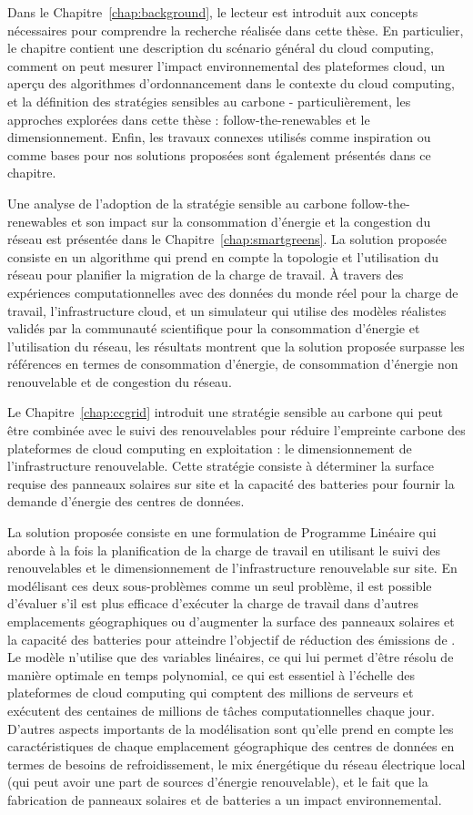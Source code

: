 Dans le Chapitre~\ref{chap:background}, le lecteur est introduit aux concepts nécessaires pour comprendre la recherche réalisée dans cette thèse. En particulier, le chapitre contient une description du scénario général du cloud computing, comment on peut mesurer l'impact environnemental des plateformes cloud, un aperçu des algorithmes d'ordonnancement dans le contexte du cloud computing, et la définition des stratégies sensibles au carbone - particulièrement, les approches explorées dans cette thèse : follow-the-renewables et le dimensionnement. Enfin, les travaux connexes utilisés comme inspiration ou comme bases pour nos solutions proposées sont également présentés dans ce chapitre.

Une analyse de l'adoption de la stratégie sensible au carbone follow-the-renewables et son impact sur la consommation d'énergie et la congestion du réseau est présentée dans le Chapitre~\ref{chap:smartgreens}. La solution proposée consiste en un algorithme qui prend en compte la topologie et l'utilisation du réseau pour planifier la migration de la charge de travail. À travers des expériences computationnelles avec des données du monde réel pour la charge de travail, l'infrastructure cloud, et un simulateur qui utilise des modèles réalistes validés par la communauté scientifique pour la consommation d'énergie et l'utilisation du réseau, les résultats montrent que la solution proposée surpasse les références en termes de consommation d'énergie, de consommation d'énergie non renouvelable et de congestion du réseau.


Le Chapitre~\ref{chap:ccgrid} introduit une stratégie sensible au carbone qui peut être combinée avec le suivi des renouvelables pour réduire l'empreinte carbone des plateformes de cloud computing en exploitation : le dimensionnement de l'infrastructure renouvelable. Cette stratégie consiste à déterminer la surface requise des panneaux solaires sur site et la capacité des batteries pour fournir la demande d'énergie des centres de données.


La solution proposée consiste en une formulation de Programme Linéaire qui aborde à la fois la planification de la charge de travail en utilisant le suivi des renouvelables et le dimensionnement de l'infrastructure renouvelable sur site. En modélisant ces deux sous-problèmes comme un seul problème, il est possible d'évaluer s'il est plus efficace d'exécuter la charge de travail dans d'autres emplacements géographiques ou d'augmenter la surface des panneaux solaires et la capacité des batteries pour atteindre l'objectif de réduction des émissions de . Le modèle n'utilise que des variables linéaires, ce qui lui permet d'être résolu de manière optimale en temps polynomial, ce qui est essentiel à l'échelle des plateformes de cloud computing qui comptent des millions de serveurs et exécutent des centaines de millions de tâches computationnelles chaque jour. D'autres aspects importants de la modélisation sont qu'elle prend en compte les caractéristiques de chaque emplacement géographique des centres de données en termes de besoins de refroidissement, le mix énergétique du réseau électrique local (qui peut avoir une part de sources d'énergie renouvelable), et le fait que la fabrication de panneaux solaires et de batteries a un impact environnemental.

